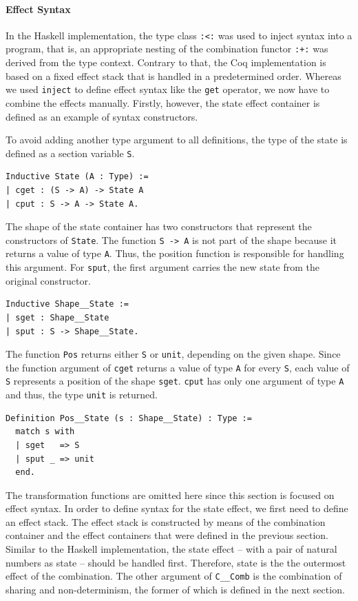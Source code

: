 \documentclass[a4paper, 11pt, fleqn, twoside]{scrreprt}
\newcommand{\hinl}[1]{\texttt{#1}}
\newcommand{\cinl}[1]{\texttt{#1}}
\begin{document}
\paragraph{Effect Syntax}

In the Haskell implementation, the type class \hinl{:<:} was used to inject syntax into a program, that is, an appropriate nesting of the combination functor \hinl{:+:} was derived from the type context.
Contrary to that, the Coq implementation is based on a fixed effect stack that is handled in a predetermined  order.
Whereas we used \hinl{inject} to define effect syntax like the \hinl{get} operator, we now have to combine the effects manually.
Firstly, however, the state effect container is defined as an example of syntax constructors.

To avoid adding another type argument to all definitions, the type of the state is defined as a section variable \cinl{S}.

\begin{verbatim}
Inductive State (A : Type) :=
| cget : (S -> A) -> State A
| cput : S -> A -> State A.
\end{verbatim}

The shape of the state container has two constructors that represent the constructors of \cinl{State}.
The function \cinl{S -> A} is not part of the shape because it returns a value of type \cinl{A}.
Thus, the position function is responsible for handling this argument.
For \cinl{sput}, the first argument carries the new state from the original constructor.

\begin{verbatim}
Inductive Shape__State :=
| sget : Shape__State
| sput : S -> Shape__State.
\end{verbatim}

The function \cinl{Pos} returns either \cinl{S} or \cinl{unit}, depending on the given shape.
Since the function argument of \cinl{cget} returns a value of type \cinl{A} for every \cinl{S}, each value of \cinl{S} represents a position of the shape \cinl{sget}.
\cinl{cput} has only one argument of type \cinl{A} and thus, the type \cinl{unit} is returned.

\begin{verbatim}
Definition Pos__State (s : Shape__State) : Type :=
  match s with
  | sget   => S
  | sput _ => unit
  end.
\end{verbatim}

The transformation functions are omitted here since this section is focused on effect syntax.
In order to define syntax for the state effect, we first need to define an effect stack.
The effect stack is constructed by means of the combination container and the effect containers that were defined in the previous section.
Similar to the Haskell implementation, the state effect -- with a pair of natural numbers as state -- should be handled first.
Therefore, state is the the outermost effect of the combination.
The other argument of \cinl{C__Comb} is the combination of sharing and non-determinism, the former of which is defined in the next section.
 
\end{document}
